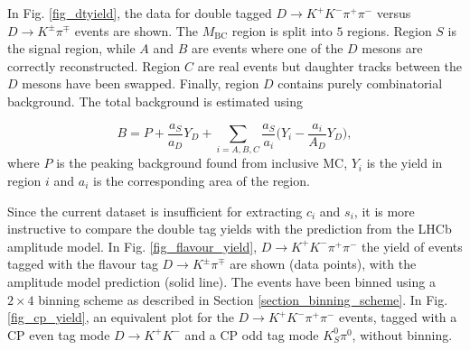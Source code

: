 \documentclass[12pt, a4paper, notitlepage, onecolumn]{article}
\numberwithin{equation}{section}
\begin{document}
In Fig. \ref{fig_dtyield}, the data for double tagged $D\to K^+K^-\pi^+\pi^-$ versus $D\to K^\pm\pi^\mp$ events are shown. The $M_\text{BC}$ region is split into $5$ regions. Region $S$ is the signal region, while $A$ and $B$ are events where one of the $D$ mesons are correctly reconstructed. Region $C$ are real events but daughter tracks between the $D$ mesons have been swapped. Finally, region $D$ contains purely combinatorial background. The total background is estimated using

\begin{equation*}
  B = P + \frac{a_S}{a_D}Y_D + \sum_{i = A, B, C}\frac{a_S}{a_i}\Big(Y_i - \frac{a_i}{A_D}Y_D\Big),
\end{equation*}
where $P$ is the peaking background found from inclusive MC, $Y_i$ is the yield in region $i$ and $a_i$ is the corresponding area of the region.

Since the current dataset is insufficient for extracting $c_i$ and $s_i$, it is more instructive to compare the double tag yields with the prediction from the LHCb amplitude model. In Fig. \ref{fig_flavour_yield}, $D\to K^+K^-\pi^+\pi^-$ the yield of events tagged with the flavour tag $D\to K^\pm\pi^\mp$ are shown (data points), with the amplitude model prediction (solid line). The events have been binned using a $2\times 4$ binning scheme as described in Section \ref{section_binning_scheme}. In Fig. \ref{fig_cp_yield}, an equivalent plot for the $D\to K^+K^-\pi^+\pi^-$ events, tagged with a CP even tag mode $D\to K^+K^-$ and a CP odd tag mode $K_S^0\pi^0$, without binning.
\end{document}
